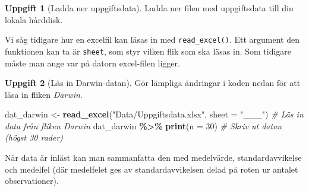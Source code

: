 \documentclass[
]{book}
\newenvironment{Shaded}{\begin{snugshade}}{\end{snugshade}}
\newcommand{\AttributeTok}[1]{\textcolor[rgb]{0.13,0.29,0.53}{#1}}
\newcommand{\CommentTok}[1]{\textcolor[rgb]{0.56,0.35,0.01}{\textit{#1}}}
\newcommand{\DecValTok}[1]{\textcolor[rgb]{0.00,0.00,0.81}{#1}}
\newcommand{\FunctionTok}[1]{\textcolor[rgb]{0.13,0.29,0.53}{\textbf{#1}}}
\newcommand{\NormalTok}[1]{#1}
\newcommand{\OtherTok}[1]{\textcolor[rgb]{0.56,0.35,0.01}{#1}}
\newcommand{\SpecialCharTok}[1]{\textcolor[rgb]{0.81,0.36,0.00}{\textbf{#1}}}
\newcommand{\StringTok}[1]{\textcolor[rgb]{0.31,0.60,0.02}{#1}}
\theoremstyle{definition}
\theoremstyle{definition}
\theoremstyle{definition}
\newtheorem{exercise}{Uppgift}[chapter]
\theoremstyle{definition}
\theoremstyle{remark}
\begin{document}
\begin{exercise}[Ladda ner uppgiftsdata]
Ladda ner filen med uppgiftsdata till din lokala hårddisk.
\end{exercise}

Vi såg tidigare hur en excelfil kan läsas in med \texttt{read\_excel()}. Ett argument den funktionen kan ta är \texttt{sheet}, som styr vilken flik som ska läsas in. Som tidigare måste man ange var på datorn excel-filen ligger.

\begin{exercise}[Läs in Darwin-datan]

Gör lämpliga ändringar i koden nedan för att läsa in fliken \emph{Darwin}.

\begin{Shaded}
\begin{Highlighting}[]
\NormalTok{dat\_darwin }\OtherTok{\textless{}{-}} \FunctionTok{read\_excel}\NormalTok{(}\StringTok{"Data/Uppgiftsdata.xlsx"}\NormalTok{, }\AttributeTok{sheet =} \StringTok{"\_\_\_"}\NormalTok{)         }\CommentTok{\# Läs in data från fliken Darwin}
\NormalTok{dat\_darwin }\SpecialCharTok{\%\textgreater{}\%} \FunctionTok{print}\NormalTok{(}\AttributeTok{n =} \DecValTok{30}\NormalTok{)                                              }\CommentTok{\# Skriv ut datan (högst 30 rader)}
\end{Highlighting}
\end{Shaded}

\end{exercise}

När data är inläst kan man sammanfatta den med medelvärde, standardavvikelse och medelfel (där medelfelet ges av standardavvikelsen delad på roten ur antalet observationer).
\end{document}
